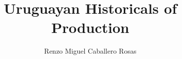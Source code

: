 \documentclass[12pt]{article}
\theoremstyle{definition}
\theoremstyle{remark}
\begin{document}
\title{Uruguayan Historicals of Production}
\author{Renzo Miguel Caballero Rosas} 
\maketitle

\begin{figure}[ht!]
\centering
{}
\end{figure}
\begin{figure}[ht!]
\centering
{}
\end{figure}
\begin{figure}[ht!]
\centering
{}
\end{figure}
\begin{figure}[ht!]
\centering
{}
\end{figure}
\begin{figure}[ht!]
\centering
{}
\end{figure}
\begin{figure}[ht!]
\centering
{}
\end{figure}
\begin{figure}[ht!]
\centering
{}
\end{figure}
\begin{figure}[ht!]
\centering
{}
\end{figure}
\begin{figure}[ht!]
\centering
{}
\end{figure}
\begin{figure}[ht!]
\centering
{}
\end{figure}
\begin{figure}[ht!]
\centering
{}
\end{figure}
\begin{figure}[ht!]
\centering
{}
\end{figure}
\begin{figure}[ht!]
\centering
{}
\end{figure}
\begin{figure}[ht!]
\centering
{}
\end{figure}
\end{document}
